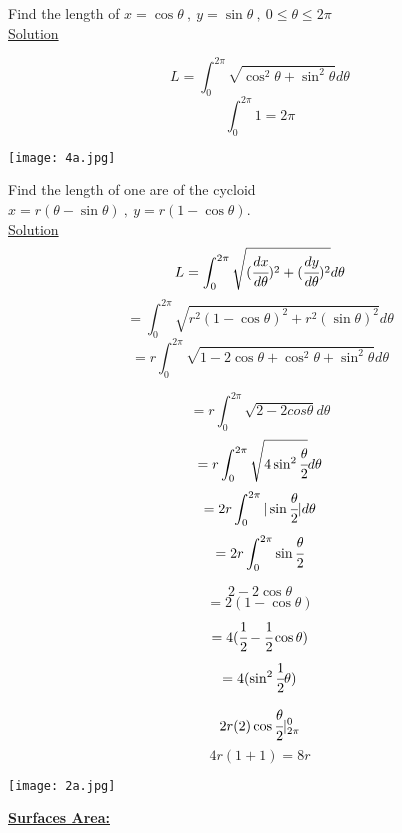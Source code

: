 \noindent{\color{smalt(darkpowderblue)}\rule{\linewidth}{.2mm}}
\begin{example}
Find the length of $x=\cos\theta~,~y=\sin\theta~,~0\leq\theta\leq 2\pi$\\
\underline{\color{smalt(darkpowderblue)}Solution} \\
\begin{minipage}{0.6\textwidth}
$$L=\int_0^{2\pi}\sqrt{\cos^2\theta+\sin^2\theta}d\theta$$
$$\int_0^{2\pi}1=2\pi$$
\end{minipage}
\begin{minipage}{0.6\textwidth}
\texttt{[image: 4a.jpg]}
\end{minipage}
\end{example}
\noindent{\color{smalt(darkpowderblue)}\rule{\linewidth}{.2mm}}
\begin{example}
Find the length of one are of the cycloid\\ $x=r(\theta-\sin\theta)~,~y=r(1-\cos\theta)$.\\
\underline{\color{smalt(darkpowderblue)}Solution} \\
$$L=\int_0^{2\pi}\sqrt{(\cfrac{dx}{d\theta})^2+(\cfrac{dy}{d\theta})^2}d\theta$$
$$=\int_0^{2\pi}\sqrt{r^2(1-\cos\theta)^2+r^2(\sin\theta)^2}d\theta$$
$$=r\int_0^{2\pi}\sqrt{1-2\cos\theta+\cos^2\theta+\sin^2\theta}d\theta$$
\begin{minipage}{0.5\textwidth}
$$=r\int_0^{2\pi}\sqrt{2-2cos\theta}d\theta$$
$$=r\int_0^{2\pi}\sqrt{4\sin^2\cfrac{\theta}{2}}d\theta$$
$$=2r\int_0^{2\pi}|\sin\cfrac{\theta}{2}|d\theta$$
$$=2r\int_0^{2\pi}\sin\cfrac{\theta}{2}$$
\end{minipage}
\begin{minipage}{0.5\textwidth}
$$2-2\cos\theta$$
$$=2(1-\cos\theta)$$
$$=4(\cfrac{1}{2}-\cfrac{1}{2}\cos\theta)$$
$$=4(\sin^2\cfrac{1}{2}\theta)$$
\end{minipage}
\begin{minipage}{0.6\textwidth}
$$2r(2)\cos\cfrac{\theta}{2}|_{2\pi}^0$$
$$4r(1+1)=8r$$
\end{minipage}
\begin{minipage}{0.5\textwidth}
\texttt{[image: 2a.jpg]}
\end{minipage}
\end{example}
\noindent{\color{smalt(darkpowderblue)}\rule{\linewidth}{.2mm}}
\textbf{\color{smalt(darkpowderblue)}\large \underline{Surfaces Area:}}
